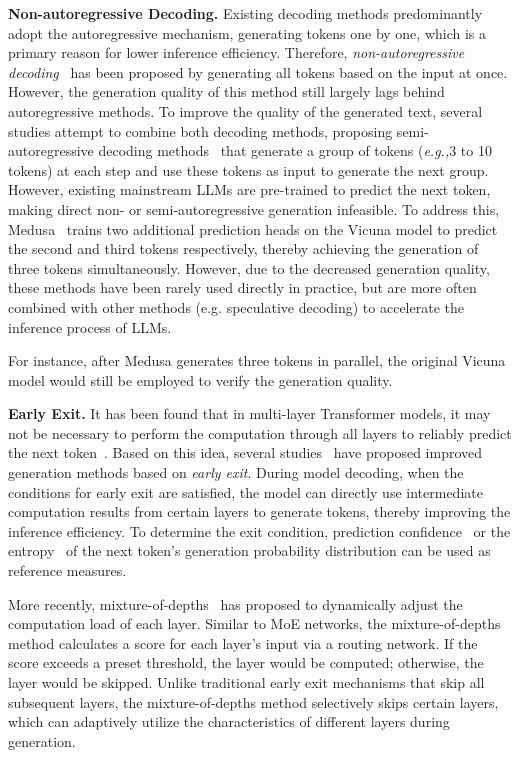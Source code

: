 \textbf{Non-autoregressive Decoding.} Existing decoding methods predominantly adopt the autoregressive mechanism, generating tokens one by one, which is a primary reason for lower inference efficiency. Therefore,  \emph{non-autoregressive decoding}~\cite{Gu-iclr-2018-Non} has been proposed by generating  {all tokens} based on the input {at once}. However, the generation quality of this method still largely lags behind autoregressive methods. To improve the quality of the generated text, several studies attempt to combine both decoding methods, proposing semi-autoregressive decoding methods~\cite{Wang-emnlp-2018-Semi} that generate a group of tokens (\emph{e.g.,}3 to 10 tokens) at each step and use these tokens as input to generate the next group. However, existing mainstream  LLMs are pre-trained to predict the next token, making direct non- or semi-autoregressive generation infeasible. To address this, Medusa~\cite{Cai-arxiv-2024-Medusa} trains two additional prediction heads on the Vicuna model to predict the second and third tokens respectively, thereby achieving the generation of three tokens simultaneously. However, due to the decreased generation quality, these methods have been rarely used directly in practice, but are more often combined with other methods (e.g. speculative decoding) to accelerate the inference process of LLMs. 

For instance, after Medusa generates three tokens in parallel, the original Vicuna model would still be   employed to verify the generation quality. 

\textbf{Early Exit.} It has been found that in multi-layer Transformer models, it may not be necessary to perform the computation through all layers to reliably predict the next token~\cite{Teerapittayanon-icpr-2016-branchynet}. Based on this idea, {several studies~\cite{Huang-iclr-2018-multi,Teerapittayanon-icpr-2016-branchynet}} have proposed improved generation methods based on \emph{early exit}. During model decoding, when  the conditions for early exit are satisfied, the model can directly use intermediate computation results from certain layers to generate tokens, thereby improving the inference efficiency. To determine the exit condition, prediction confidence~\cite{Huang-iclr-2018-multi} or the entropy~\cite{Teerapittayanon-icpr-2016-branchynet} of the next token's generation probability distribution can be used as reference measures. 

More recently, mixture-of-depths~\cite{raposo-arxiv-2024-mixture} has proposed to dynamically adjust the computation load of each layer. Similar to MoE networks, the mixture-of-depths method calculates a score for each layer's input via a routing network. If the score exceeds a preset threshold, the layer would be computed; otherwise, the layer would be skipped. Unlike traditional early exit mechanisms that skip all subsequent layers, the mixture-of-depths method selectively skips certain layers, which can adaptively utilize the characteristics of different layers during generation. 


